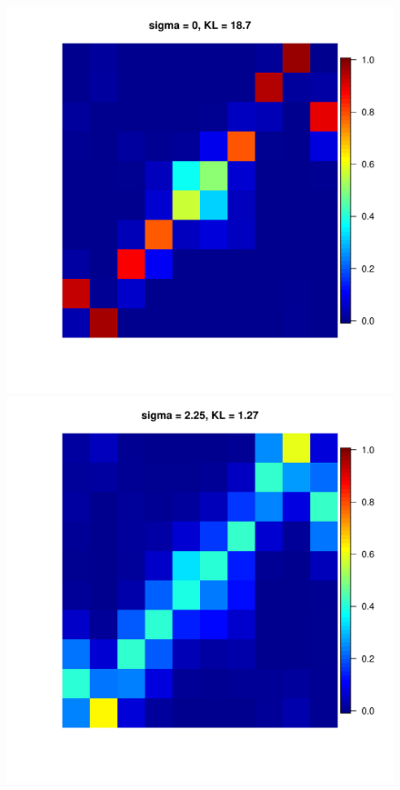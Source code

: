 \documentclass[11pt, oneside]{article}   	%
\begin{document}
\begin{figure}[h!]
{\begin{minipage}[t]{.3\textwidth}
	\end{minipage}
	\hfill
	\begin{minipage}[t]{.3\textwidth}
		\centering
		\includegraphics[width=\textwidth]{figures/Pseudo_alpha1N100n100run1sd0.pdf}

	\end{minipage} 
	\hfill
\begin{minipage}[t]{.3\textwidth}
	\centering
	\includegraphics[width=\textwidth]{figures/Pseudo_alpha1N100n100run1sd2dot25.pdf}
	

\end{minipage}}
\end{figure}
\end{document}
